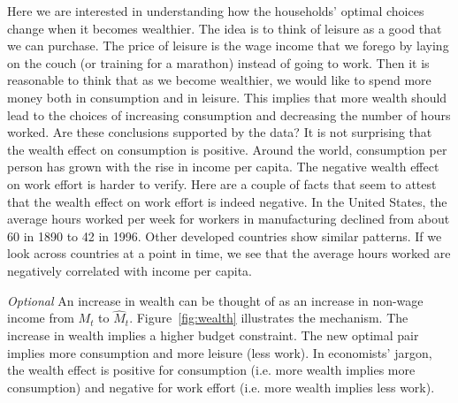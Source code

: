 \documentclass[letterpaper,12pt]{article}
\begin{document}
Here we are interested in understanding how the households'
optimal choices change when it becomes wealthier. The idea is to
think of leisure as a good that we can purchase. The price of
leisure is the wage income that we forego by laying on the couch
(or training for a marathon) instead of going to work. Then it is
reasonable to think that as we become wealthier, we would like to
spend more money both in consumption and in leisure. This implies
that more wealth should lead to the choices of increasing
consumption and decreasing the number of hours worked. Are these
conclusions supported by the data? It is not surprising that the
wealth effect on consumption is positive. Around the world,
consumption per person has grown with the rise in income per
capita. The negative wealth effect on work effort is harder to
verify. Here are a couple of facts that seem to attest that the
wealth effect on work effort is indeed negative. In the United
States, the average hours worked per week for workers in
manufacturing declined from about 60 in 1890 to 42 in 1996. Other
developed countries show similar patterns. If we look across
countries at a point in time, we see that the average hours worked
are negatively correlated with income per capita.

\textit{Optional} \footnotesize An increase in wealth can be
thought of as an increase in non-wage income from $M_{t}$ to
$\hat{M}_{t}$. Figure~\ref{fig:wealth} illustrates the mechanism.
The increase in wealth implies a higher budget constraint. The new
optimal pair implies more consumption and more leisure (less
work). In economists' jargon, the wealth effect is positive for
consumption (i.e. more wealth implies more consumption) and
negative for work effort (i.e. more wealth implies less work).

\end{document}
